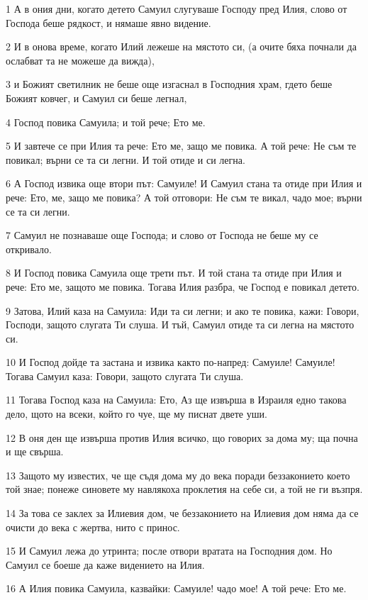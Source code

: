 \par 1 А в ония дни, когато детето Самуил слугуваше Господу пред Илия, слово от Господа беше рядкост, и нямаше явно видение.
\par 2 И в онова време, когато Илий лежеше на мястото си, (а очите бяха почнали да ослабват та не можеше да вижда),
\par 3 и Божият светилник не беше още изгаснал в Господния храм, гдето беше Божият ковчег, и Самуил си беше легнал,
\par 4 Господ повика Самуила; и той рече; Ето ме.
\par 5 И завтече се при Илия та рече: Ето ме, защо ме повика. А той рече: Не съм те повикал; върни се та си легни. И той отиде и си легна.
\par 6 А Господ извика още втори път: Самуиле! И Самуил стана та отиде при Илия и рече: Ето, ме, защо ме повика? А той отговори: Не съм те викал, чадо мое; върни се та си легни.
\par 7 Самуил не познаваше още Господа; и слово от Господа не беше му се откривало.
\par 8 И Господ повика Самуила още трети път. И той стана та отиде при Илия и рече: Ето ме, защото ме повика. Тогава Илия разбра, че Господ е повикал детето.
\par 9 Затова, Илий каза на Самуила: Иди та си легни; и ако те повика, кажи: Говори, Господи, защото слугата Ти слуша. И тъй, Самуил отиде та си легна на мястото си.
\par 10 И Господ дойде та застана и извика както по-напред: Самуиле! Самуиле! Тогава Самуил каза: Говори, защото слугата Ти слуша.
\par 11 Тогава Господ каза на Самуила: Ето, Аз ще извърша в Израиля едно такова дело, щото на всеки, който го чуе, ще му писнат двете уши.
\par 12 В оня ден ще извърша против Илия всичко, що говорих за дома му; ща почна и ще свърша.
\par 13 Защото му известих, че ще съдя дома му до века поради беззаконието което той знае; понеже синовете му навлякоха проклетия на себе си, а той не ги възпря.
\par 14 За това се заклех за Илиевия дом, че беззаконието на Илиевия дом няма да се очисти до века с жертва, нито с принос.
\par 15 И Самуил лежа до утринта; после отвори вратата на Господния дом. Но Самуил се боеше да каже видението на Илия.
\par 16 А Илия повика Самуила, казвайки: Самуиле! чадо мое! А той рече: Ето ме.
